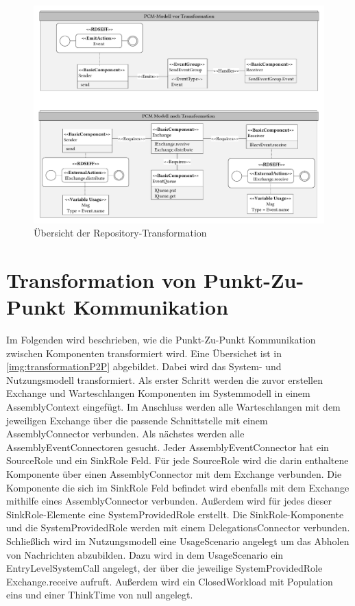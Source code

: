 \begin{figure}
\center
  \includegraphics[width=1\textwidth]{images/transformation/transformationRepository.pdf}
  \caption{Übersicht der Repository-Transformation}
  \label{img:transformationRepository}
\end{figure}


\section{Transformation von Punkt-Zu-Punkt Kommunikation}
Im Folgenden wird beschrieben, wie die Punkt-Zu-Punkt Kommunikation zwischen Komponenten transformiert wird. Eine Übersichet ist in \autoref{img:transformationP2P} abgebildet. Dabei wird das System- und Nutzungsmodell transformiert. Als erster Schritt werden die zuvor erstellen Exchange und Warteschlangen Komponenten im Systemmodell in einem AssemblyContext eingefügt. Im Anschluss werden alle Warteschlangen mit dem jeweiligen Exchange über die passende Schnittstelle mit einem AssemblyConnector verbunden. Als nächstes werden alle AssemblyEventConnectoren gesucht. Jeder AssemblyEventConnector hat ein SourceRole und ein SinkRole Feld. Für jede SourceRole wird die darin enthaltene Komponente über einen AssemblyConnector mit dem Exchange verbunden. Die Komponente die sich im SinkRole Feld befindet wird ebenfalls mit dem Exchange mithilfe eines AssemblyConnector verbunden. Außerdem wird für jedes dieser SinkRole-Elemente eine SystemProvidedRole erstellt. Die SinkRole-Komponente und die SystemProvidedRole werden mit einem DelegationsConnector verbunden. Schließlich wird im Nutzungsmodell eine UsageScenario angelegt um das Abholen von Nachrichten abzubilden. Dazu wird in dem UsageScenario ein EntryLevelSystemCall angelegt, der über die jeweilige SystemProvidedRole Exchange.receive aufruft. Außerdem wird ein ClosedWorkload mit Population eins und einer ThinkTime von null angelegt.

